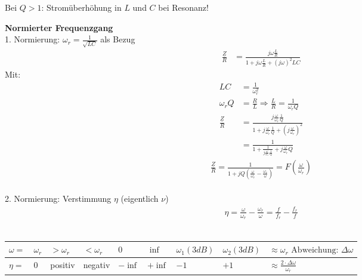 Bei $Q>1$: Stromüberhöhung in $L$ und $C$ bei Resonanz!

% 	

\textbf{Normierter Frequenzgang}\\
1. Normierung: $\omega_r=\frac{1}{\sqrt{LC}}$ als Bezug\\
\begin{align}
	\frac{\underline{Z}}{R} &=
	\frac{j\omega\frac{L}{R}}{1+j\omega\frac{L}{R}+(j\omega)^2LC}\nonumber
\end{align}
Mit:
\begin{align}
	LC&=\frac{1}{\omega_r^2}\nonumber\\
	\omega_rQ &= \frac{R}{L} \Rightarrow \frac{L}{R}=\frac{1}{\omega_rQ}\nonumber\\
	\frac{\underline{Z}}{R} &=
	\frac{j\frac{\omega}{\omega_r}\frac{1}{Q}}{1+j\frac{\omega}{\omega_r}\frac{1}{Q}+\left(j\frac{\omega}{\omega_r}\right)^2}\nonumber\\
	&=\frac{1}{1+\frac{1}{j\frac{\omega}{\omega_r}\frac{1}{Q}}+j\frac{\omega}{\omega_r}Q}\nonumber
	\end{align}
	\begin{align}
	\boxed{\frac{\underline{Z}}{R} =
	\frac{1}{1+jQ\left(\frac{\omega}{\omega_r}-\frac{\omega_r}{\omega}\right)} =
	F\left(\frac{\omega}{\omega_r}\right)}
\end{align}\\
2. Normierung: Verstimmung $\eta$ (eigentlich $\nu$)\\
\begin{align}
	\boxed{\eta=\frac{\omega}{\omega_r}-\frac{\omega_r}{\omega}} = \frac{f}{f_r} -
	\frac{f_r}{f}
\end{align}\\
\begin{tabular}{l|l|l|l|l|l|l|l|l|}
	$\omega =$ &
	$\omega_r$ &
	$>\omega_r$ &
	$<\omega_r$ &
	$0$ &
	$\inf$ &
	$\omega_1(3dB)$ &
	$\omega_2(3dB)$ &
	$\approx\omega_r \text{ Abweichung: } \Delta\omega$	
	\\
	\hline
	$\eta =$ &
	$0$ &
	positiv &
	negativ &
	$-\inf$ &
	$+\inf$ &
	$-1$ &
	$+1$ &
	$\approx\frac{2\cdot\Delta\omega}{\omega_r}$\\	
\end{tabular}

